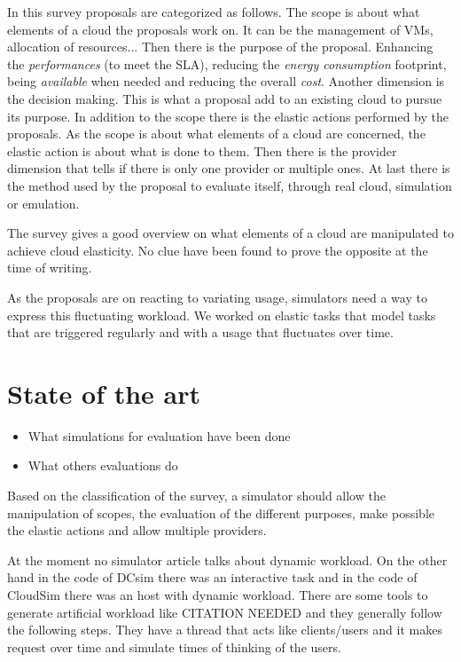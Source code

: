 \documentclass[a4paper]{IEEEtran}
\begin{document}
  In this survey proposals are categorized as follows. The scope is about what
  elements of a cloud the proposals work on. It can be the management of VMs,
  allocation of resources... Then there is the purpose of the proposal.
  Enhancing the \textit{performances} (to meet the SLA), reducing the
  \textit{energy consumption} footprint, being \textit{available} when needed
  and reducing the overall \textit{cost}. Another dimension is the decision
  making. This is what a proposal add to an existing cloud to pursue its
  purpose. In addition to the scope there is the elastic actions performed by
  the proposals. As the scope is about what elements of a cloud are concerned,
  the elastic action is about what is done to them. Then there is the provider
  dimension that tells if there is only one provider or multiple ones. At last
  there is the method used by the proposal to evaluate itself, through real
  cloud, simulation or emulation.
  
  The survey gives a good overview on what elements of a cloud are
  manipulated to achieve cloud elasticity. No clue have been found to prove the 
  opposite at the time of writing.
  
  As the proposals are on reacting to variating usage, simulators need a way to
  express this fluctuating workload. We worked on elastic tasks that model tasks
  that are triggered regularly and with a usage that fluctuates over time.


\section{State of the art} \label{sota}
  \begin{itemize}
    \item What simulations for evaluation have been done
    \item What others evaluations do
  \end{itemize}
  
  Based on the classification of the survey, a simulator should allow the
  manipulation of scopes, the evaluation of the different purposes, make
  possible the elastic actions and allow multiple providers.
  
  At the moment no simulator article talks about dynamic workload. On the other
  hand in the code of DCsim \cite{tighe2013towards} there was an interactive
  task and in the code of CloudSim \cite{calheiros2011cloudsim} there was an
  host with dynamic workload. There are some tools to generate artificial 
  workload like CITATION NEEDED and they generally follow the following steps. 
  They have a thread that acts like clients/users and it makes request over 
  time and simulate times of thinking of the users.
  
\end{document}
